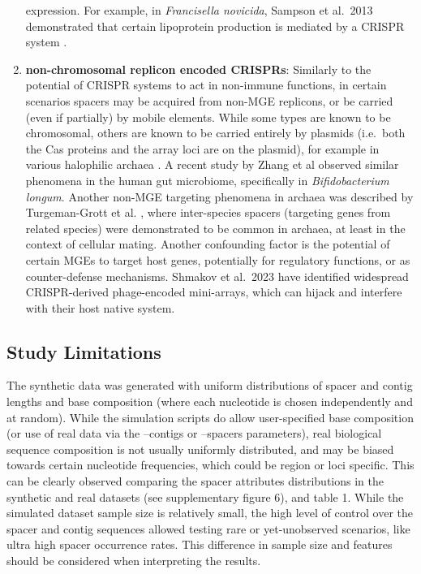 \documentclass[
]{article}
\begin{document}
\begin{enumerate}
  expression. For example, in \emph{Francisella novicida}, Sampson et
  al.~2013 demonstrated that certain lipoprotein production is mediated
  by a CRISPR system \autocite{Sampson_2013}.
\item
  \textbf{non-chromosomal replicon encoded CRISPRs}: Similarly to the
  potential of CRISPR systems to act in non-immune functions, in certain
  scenarios spacers may be acquired from non-MGE replicons, or be
  carried (even if partially) by mobile elements. While some types are
  known to be chromosomal, others are known to be carried entirely by
  plasmids (i.e.~both the Cas proteins and the array loci are on the
  plasmid), for example in various halophilic archaea
  \autocite{Maier_2018}. A recent study by Zhang et al
  \autocite{Zhang_2025} observed similar phenomena in the human gut
  microbiome, specifically in \emph{Bifidobacterium longum}. Another
  non-MGE targeting phenomena in archaea was described by Turgeman-Grott
  et al. \autocite{Turgeman_Grott_2018}, where inter-species spacers
  (targeting genes from related species) were demonstrated to be common
  in archaea, at least in the context of cellular mating. Another
  confounding factor is the potential of certain MGEs to target host
  genes, potentially for regulatory functions, or as counter-defense
  mechanisms\autocite{Shmakov_2023}. Shmakov et al.~2023 have identified
  widespread CRISPR-derived phage-encoded mini-arrays, which can hijack
  and interfere with their host native system.
\end{enumerate}

\subsection{Study Limitations}\label{study-limitations}

The synthetic data was generated with uniform distributions of spacer
and contig lengths and base composition (where each nucleotide is chosen
independently and at random). While the simulation scripts do allow
user-specified base composition (or use of real data via the --contigs
or --spacers parameters), real biological sequence composition is not
usually uniformly distributed, and may be biased towards certain
nucleotide frequencies, which could be region or loci specific. This can
be clearly observed comparing the spacer attributes distributions in the
synthetic and real datasets (see supplementary figure 6), and table 1.
While the simulated dataset sample size is relatively small, the high
level of control over the spacer and contig sequences allowed testing
rare or yet-unobserved scenarios, like ultra high spacer occurrence
rates. This difference in sample size and features should be considered
when interpreting the results.
\end{document}
